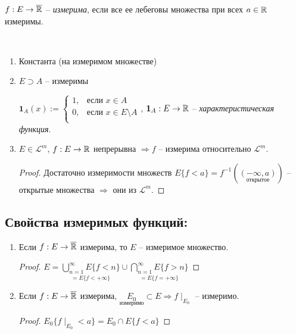 \begin{definition}
    $f:E\rightarrow \overline{\mathbb{R}}$ – \textit{измерима}, если все ее лебеговы множества 
    при всех $a\in \mathbb{R}$ измеримы.
\end{definition}

\begin{example}~
    \begin{enumerate}
        \item Константа (на измеримом множестве)
        
        \item $E\supset A$ – измеримы
        
        $\mathbf{1}_A(x):= \left\{\begin{array}{ll}
            1, & \text{если } x\in A \\
            0, & \text{если } x\in E \setminus A \\ 
        \end{array}\right.$, $\mathbf{1}_A :E \rightarrow \mathbb{R}$ – \textit{характеристическая функция}.

        \item $E\in \mathcal{L}^m$, $f:E\rightarrow \mathbb{R}$ непрерывна $\Rightarrow f$ – 
        измерима относительно $\mathcal{L}^m$.

        \begin{proof}
            Достаточно измеримости множеств $E\{f<a\}=f^{-1}(\underset{\text{открытое}}{(-\infty, a)})$ – открытые 
            множества $\Rightarrow$ они из  $\mathcal{L}^m$.
        \end{proof}
    \end{enumerate}
\end{example}

\subsection*{Свойства измеримых функций:}

\begin{enumerate}
    \item Если $f:E\rightarrow \overline{\mathbb{R}}$ измерима, то $E$ – измеримое множество.
    
    \begin{proof}
        $E=\underset{=E\{f<+\infty\}}{\bigcup\limits_{n=1}^\infty E\{f < n\}}\cup \underset{=E\{f=+\infty\}}{\bigcap\limits_{n=1}^\infty E\{f > n\}}$
    \end{proof}

    \item Если $f:E\rightarrow \overline{\mathbb{R}}$ измерима, $\underset{\text{измеримо}}{E_0}\subset E\Rightarrow f\mid_{E_0}$
    – измеримо.

    \begin{proof}
        $E_0\{f\mid_{E_0}< a\}=E_0\cap E\{f < a\}$
    \end{proof}
\end{enumerate}